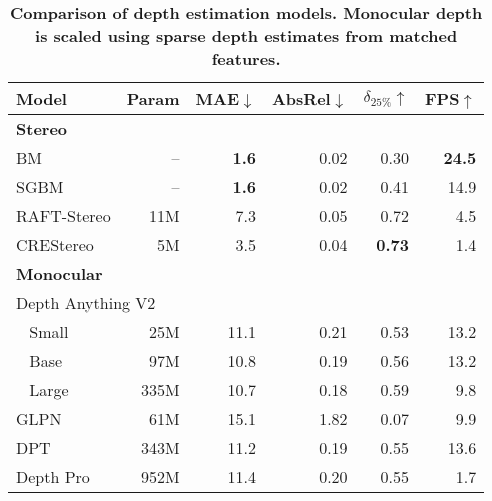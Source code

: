 \begin{table}[t]
	\centering
	\small
	\caption{\bfseries Comparison of depth estimation models. Monocular depth is scaled using sparse depth estimates from matched features.}
	\label{tab:depth_models}
	\begin{tabular}{|lrrrrr|}
		\hline
		\textbf{Model}                          &
		\textbf{Param}                          &
		\textbf{MAE}$\downarrow$                &
		\textbf{AbsRel}$\downarrow$             &
		\textbf{$\delta_{25\%}$}$\uparrow$      &
		\textbf{FPS}$\uparrow$                                                                               \\
		\hline\hline
		\textbf{Stereo}                         &      &              &      &               &               \\
		BM                                      & --   & \textbf{1.6} & 0.02 & 0.30          & \textbf{24.5} \\
		SGBM                                    & --   & \textbf{1.6} & 0.02 & 0.41          & 14.9          \\
		RAFT-Stereo                             & 11M  & 7.3          & 0.05 & 0.72          & 4.5           \\
		CREStereo                               & 5M   & 3.5          & 0.04 & \textbf{0.73} & 1.4           \\
		\hline\hline
		\multicolumn{2}{|l}{\textbf{Monocular}} &      &              &      &                               \\
		\multicolumn{2}{|l}{Depth Anything V2}  &      &              &      &                               \\
		~ Small                                 & 25M  & 11.1         & 0.21 & 0.53          & 13.2          \\
		~ Base                                  & 97M  & 10.8         & 0.19 & 0.56          & 13.2          \\
		~ Large                                 & 335M & 10.7         & 0.18 & 0.59          & 9.8           \\
		GLPN                                    & 61M  & 15.1         & 1.82 & 0.07          & 9.9           \\
		DPT                                     & 343M & 11.2         & 0.19 & 0.55          & 13.6          \\
		Depth Pro                               & 952M & 11.4         & 0.20 & 0.55          & 1.7           \\
		\hline
	\end{tabular}
\end{table}
